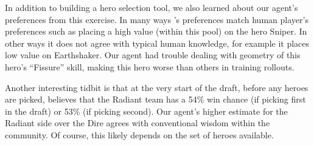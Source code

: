 \documentclass[ocean-paper.tex]{subfiles}
\begin{document}
In addition to building a hero selection tool, we also learned about our agent's preferences from this exercise.
In many ways \openaifive's preferences match human player's preferences such as placing a high value (within this pool) on the hero Sniper.
In other ways it does not agree with typical human knowledge,
for example 
it places low value on Earthshaker.
Our agent had trouble dealing with geometry of this hero's ``Fissure'' skill, making this hero worse than others in training rollouts.

Another interesting tidbit is that at the very start of the draft, before any heroes are picked, \openaifive believes that the Radiant team has a 54\% win chance (if picking first in the draft) or 53\% (if picking second).
Our agent's higher estimate for the Radiant side over the Dire agrees with conventional wisdom within the \dota community.
Of course, this likely depends on the set of heroes available.
\end{document}
